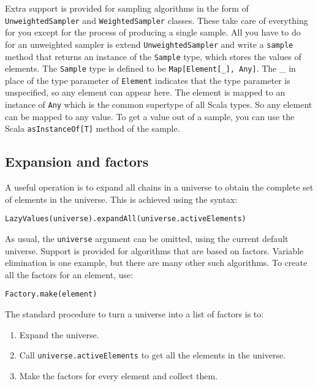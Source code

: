 Extra support is provided for sampling algorithms in the form of \texttt{UnweightedSampler} and \texttt{WeightedSampler} classes. These take care of everything for you except for the process of producing a single sample. All you have to do for an unweighted sampler is extend \texttt{Unweight\-edSampler} and write a \texttt{sample} method that returns an instance of the \texttt{Sample} type, which stores the values of elements. The \texttt{Sample} type is defined to be \texttt{Map[Element[\_], Any]}. The \_ in place of the type parameter of \texttt{Element} indicates that the type parameter is unspecified, so any element can appear here. The element is mapped to an instance of \texttt{Any} which is the common supertype of all Scala types. So any element can be mapped to any value. To get a value out of a sample, you can use the Scala \texttt{asInstanceOf[T]} method of the sample.

\subsection{Expansion and factors}

A useful operation is to expand all chains in a universe to obtain the complete set of elements in the universe. This is achieved using the syntax:

\begin{flushleft}
\texttt{LazyValues(universe).expandAll(universe.activeElements)}
\end{flushleft}

As usual, the \texttt{universe} argument can be omitted, using the current default universe. Support is provided for algorithms that are based on factors. Variable elimination is one example, but there are many other such algorithms. To create all the factors for an element, use:

\begin{flushleft}
\texttt{Factory.make(element)}
\end{flushleft}

The standard procedure to turn a universe into a list of factors is to:
\begin{enumerate}
\item Expand the universe.
\item Call \texttt{universe.activeElements} to get all the elements in the universe.
\item Make the factors for every element and collect them.
\end{enumerate}

